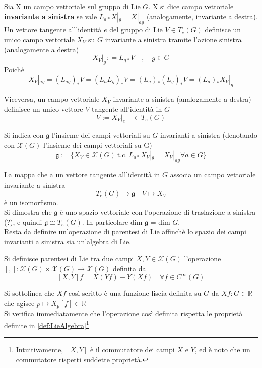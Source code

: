 Sia X un campo vettoriale sul gruppo di Lie $G$. X si dice campo vettoriale
\textbf{invariante a sinistra} se vale $L_{a*}X|_g = X|_{ag}$ (analogamente,
invariante a destra).\\

Un vettore tangente all'identità $e$ del gruppo di Lie $V \in T_e(G)$
definisce un unico campo vettoriale $X_V$ su $G$ invariante a sinistra tramite
l'azione sinistra (analogamente a destra)
$$
   X_V|_g : = L_{g*} V \quad , \quad g \in G
$$
Poichè
$$
   X_V|_{ag} = (L_{ag})_* V = (L_a L_g)_* V = (L_a)_*(L_g)_* V = (L_a)_* X_V|_g
$$

Viceversa, un campo vettoriale $X_V$ invariante a sinistra (analogamente a destra)
definisce un unico vettore $V$ tangente all'identità in $G$
$$
   V := X_V|_e \quad \in T_e(G)
$$
\begin{definition}\label{def:GroupLieLlgebra}
  Si indica con $\mathfrak{g}$ l'insieme dei campi vettoriali su $G$ invarianti
  a sinistra (denotando con $\mathcal{X}(G)$ l'insieme dei campi vettoriali su G)
  $$
    \mathfrak{g} := \{ X_V \in \mathcal{X}(G) \mathrm{\: t.c. \:}
       L_{a*}X_V|_g = X_V|_{ag} \forall a \in G \}
  $$
\end{definition}
La mappa che a un vettore tangente all'identità in $G$ associa un campo vettoriale
invariante a sinistra
$$
   T_e(G) \to \mathfrak{g}  \quad V \mapsto X_V
$$
è un isomorfismo. \\
Si dimostra che $\mathfrak{g}$ è uno spazio vettoriale con l'operazione di
traslazione a sinistra (?), e quindi $\mathfrak{g} \cong T_e(G)$.
In particolare dim $\mathfrak{g}$ = dim $G$.\\

Resta da definire un'operazione di parentesi di Lie affinchè lo spazio dei campi
invarianti a sinistra sia un'algebra di Lie.\\
\begin{definition}\label{def:parentesiLie}
   Si definisce parentesi di Lie tra due campi $X,Y \in \mathcal{X}(G)$ l'operazione
   $[,] : \mathcal{X}(G) \times \mathcal{X}(G) \to \mathcal{X}(G)$ definita da
   $$
      [X,Y]f = X(Yf) - Y(Xf) \quad \forall f \in C^\infty(G)
   $$
\end{definition}
Si sottolinea che $Xf$ così scritto è una funzione liscia definita su $G$ da
$Xf : G \in \mathbb{R}$ che agisce $p \mapsto X_p[f]\in \mathbb{R}$\\

Si verifica immediatamente che l'operazione così definita rispetta le proprietà
definite in \ref{def:LieAlgebra}\footnote{Intuitivamente, $[X,Y]$ è il commutatore
dei campi $X$ e $Y$, ed è noto che un commutatore rispetti suddette proprietà.}\\

